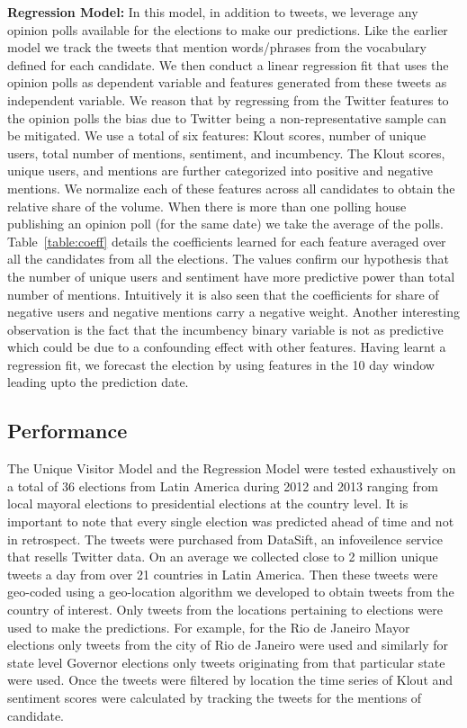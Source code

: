 \noindent
{\bf Regression Model:}
In this model, in addition to tweets, we leverage any opinion polls available for the elections 
to make our predictions.
Like the earlier model we track the tweets that mention words/phrases
from the vocabulary defined for each candidate.
We then conduct a linear regression fit that uses the opinion polls as dependent variable and features generated from 
these tweets as independent variable.
We reason that by regressing from the Twitter features to the opinion polls the bias due to Twitter being a non-representative sample
can be mitigated.
We use a total of six features: Klout scores, number of unique users, total number of mentions, sentiment, and incumbency.
The Klout scores, unique users, and mentions are further categorized into positive and negative mentions.
We normalize each of these features across all candidates to obtain the relative share of the volume. 
When there is more than one polling house publishing an opinion poll (for the same date) we take the average of the polls. 
Table~\ref{table:coeff} details the coefficients learned for each feature averaged over all the candidates from all the elections.
The values confirm our hypothesis that the number of unique users and sentiment have more predictive power than total number of mentions.
Intuitively it is also seen that the coefficients for share of negative users and negative mentions carry a negative weight.
Another interesting observation is the fact that the incumbency binary variable is not as predictive which could be
due to a confounding effect with other features. Having learnt a regression fit, we forecast the election
by using features in the 10 day window leading upto the prediction date.

\iffalse
\subsection{Performance}
The Unique Visitor Model and the Regression Model were tested exhaustively on a total of 36 elections from Latin America during 2012 and 2013 ranging from local mayoral elections to presidential elections at the country level.
It is important to note that every single election was predicted ahead of time and not in retrospect.
The tweets were purchased from DataSift, an infoveilence service that resells Twitter data.
On an average we collected close to 2 million unique tweets a day from over 21 countries in Latin America.
Then these tweets were geo-coded using a geo-location algorithm we developed to obtain tweets from the country of interest.
Only tweets from the locations pertaining to elections were used to make the predictions.
For example, for the Rio de Janeiro Mayor elections only tweets from the city of Rio de Janeiro were used and similarly for state level Governor elections only tweets originating from that particular state were used.
Once the tweets were filtered by location the time series of Klout and sentiment scores were calculated by tracking the tweets for the mentions of candidate.

